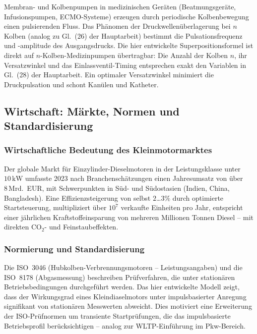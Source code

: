 ﻿\documentclass[a4paper,12pt]{article}
\begin{document}
Membran- und Kolbenpumpen in medizinischen Geräten (Beatmungsgeräte,
Infusionspumpen, ECMO-Systeme) erzeugen durch periodische Kolbenbewegung
einen pulsierenden Fluss. Das Phänomen der Druckwellenüberlagerung
bei $n$ Kolben (analog zu Gl.~(26) der Hauptarbeit) bestimmt
die Pulsationsfrequenz und -amplitude des Ausgangsdrucks.
Die hier entwickelte Superpositionsformel ist direkt auf
$n$-Kolben-Medizinpumpen übertragbar: Die Anzahl der Kolben $n$,
ihr Versatzwinkel und das Einlassventil-Timing entsprechen exakt
den Variablen in Gl.~(28) der Hauptarbeit. Ein optimaler Versatzwinkel
minimiert die Druckpulsation und schont Kanülen und Katheter.

\subsection{Wirtschaft: Märkte, Normen und Standardisierung}

\subsubsection{Wirtschaftliche Bedeutung des Kleinmotormarktes}

Der globale Markt für Einzylinder-Dieselmotoren in der Leistungsklasse
unter $10\,\text{kW}$ umfasste 2023 nach Branchenschätzungen einen
Jahresumsatz von über $8\,\text{Mrd.}$~EUR, mit Schwerpunkten in
Süd- und Südostasien (Indien, China, Bangladesh). Eine Effizienzsteigerung
von selbst $2$\ldots$3\%$ durch optimierte Startsteuerung, multipliziert
über $10^7$ verkaufte Einheiten pro Jahr, entspricht einer jährlichen
Kraftstoffeinsparung von mehreren Millionen Tonnen Diesel -- mit
direkten CO$_2$- und Feinstaubeffekten.

\subsubsection{Normierung und Standardisierung}

Die ISO~3046 (Hubkolben-Verbrennungsmotoren -- Leistungsangaben) und
die ISO~8178 (Abgasmessung) beschreiben Prüfverfahren, die unter
stationären Betriebsbedingungen durchgeführt werden. Das hier entwickelte
Modell zeigt, dass der Wirkungsgrad eines Kleindiaselmotors unter
impulsbasierter Anregung signifikant von stationären Messwerten abweicht.
Dies motiviert eine Erweiterung der ISO-Prüfnormen um
transiente Startprüfungen, die das impulsbasierte Betriebsprofil
berücksichtigen -- analog zur WLTP-Einführung im Pkw-Bereich.
\end{document}
